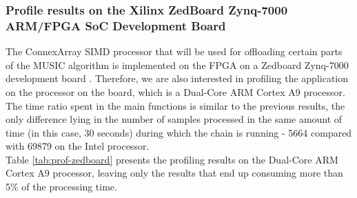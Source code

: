 \subsubsection{Profile results on the Xilinx ZedBoard Zynq-7000 ARM/FPGA SoC
Development Board}

The ConnexArray SIMD processor that will be used for offloading certain parts of
the MUSIC algorithm is implemented on the FPGA on a Zedboard Zynq-7000
development board \cite{cite:zedboard}. Therefore, we are also interested in
profiling the application on the processor on the board, which is a Dual-Core
ARM Cortex A9 processor. The time ratio spent in the main functions is similar
to the previous results, the only difference lying in the number of samples
processed in the same amount of time (in this case, 30 seconds) during which the
chain is running - 5664 compared with 69879 on the Intel processor. \\

Table \ref{tab:prof-zedboard} presents the profiling results on the Dual-Core
ARM Cortex A9 processor, leaving only the results that end up consuming more
than 5\% of the processing time.




